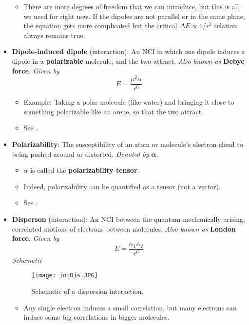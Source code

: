 \documentclass[../notes.tex]{subfiles}
\begin{document}
\begin{itemize}
\begin{itemize}
        \item There are more degrees of freedom that we can introduce, but this is all we need for right now. If the dipoles are not parallel or in the same plane, the equation gets more complicated but the critical $\Delta E\propto 1/r^3$ relation always remains true.
    \end{itemize}
    \item \textbf{Dipole-induced dipole} (interaction): An NCI in which one dipole induces a dipole in a \textbf{polarizable} molecule, and the two attract. \emph{Also known as} \textbf{Debye force}. \emph{Given by}
    \begin{equation*}
        E = \frac{\mu^2\alpha}{r^6}
    \end{equation*}
    \begin{itemize}
        \item Example: Taking a polar molecule (like water) and bringing it close to something polarizable like an arene, so that the two attract.
        \item See \textcite[187-88]{bib:Anslyn}.
    \end{itemize}
    \item \textbf{Polarizability}: The susceptibility of an atom or molecule's electron cloud to being pushed around or distorted. \emph{Denoted by} $\bm{\alpha}$.
    \begin{itemize}
        \item $\alpha$ is called the \textbf{polarizability tensor}.
        \item Indeed, polarizability can be quantified as a tensor (not a vector).
        \item See \textcite[24-25]{bib:Anslyn}.
    \end{itemize}
    \item \textbf{Disperson} (interaction): An NCI between the quantum-mechanically arising, correlated motions of electrons between molecules. \emph{Also known as} \textbf{London force}. \emph{Given by}
    \begin{equation*}
        E = \frac{\alpha_1\alpha_2}{r^6}
    \end{equation*}
    \emph{Schematic}
    \begin{figure}[h!]
        \centering
        \texttt{[image: intDis.JPG]}
        \caption{Schematic of a dispersion interaction.}
        \label{fig:intDis}
    \end{figure}
    \begin{itemize}
        \item Any single electron induces a small correlation, but many electrons can induce some big correlations in bigger molecules.

\end{itemize}
\end{itemize}
\end{document}
